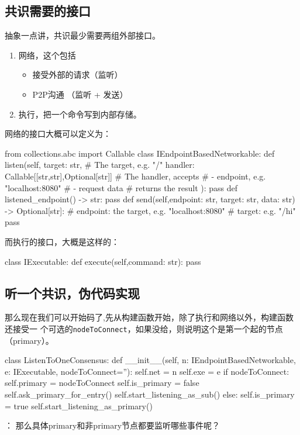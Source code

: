 \documentclass[dvipsnames]{ctexart}
\begin{document}
\subsection{共识需要的接口}
抽象一点讲，共识最少需要两组外部接口。
\begin{enumerate}
\item 网络，这个包括
  \begin{itemize}
  \item 接受外部的请求（监听）
  \item P2P沟通 （监听 + 发送）
  \end{itemize}
\item 执行，把一个命令写到内部存储。
\end{enumerate}
网络的接口大概可以定义为：
\begin{simplepy}
from collections.abc import Callable
class IEndpointBasedNetworkable:
    def listen(self,
               target: str,     # The target, e.g. "/"
               handler: Callable[[str,str],Optional[str]]
               # The handler, accepts
               #  - endpoint, e.g. "localhost:8080"
               #  - request data
               # returns the result
               ):
        pass
    def listened_endpoint() -> str:
        pass
    def send(self,endpoint: str, target: str, data: str) -> Optional[str]:
        # endpoint: the target, e.g. "localhost:8080"
        # target: e.g. "/hi"
        pass
\end{simplepy}
而执行的接口，大概是这样的：
\begin{simplepy}
class IExecutable:
    def execute(self,command: str):
        pass
\end{simplepy}

\subsection{\textbf{听一个共识}，伪代码实现}
那么现在我们可以开始码了,先从构建函数开始，除了执行和网络以外，构建函数还接受一
个可选的\texttt{nodeToConnect}，如果没给，则说明这个是第一个起的节点（primary）。
\begin{simplepy}
class ListenToOneConsensus:
    def __init__(self,
                 n: IEndpointBasedNetworkable,
                 e: IExecutable,
                 nodeToConnect=''):
        self.net = n
        self.exe = e
        if nodeToConnect:
            self.primary = nodeToConnect
            self.is_primary = false
            self.ask_primary_for_entry()
            self.start_listening_as_sub()
        else:
            self.is_primary = true
            self.start_listening_as_primary()
\end{simplepy}
 ： 那么具体primary和非primary节点都要监听哪些事件呢？
\end{document}

